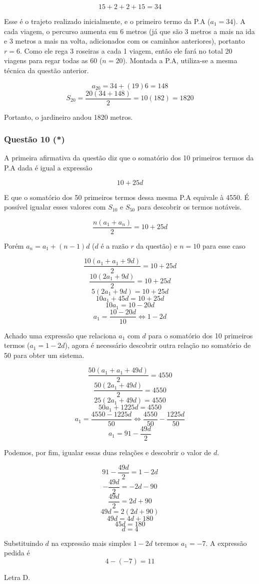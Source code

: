 \documentclass[11pt]{article}
\begin{document}
\[15 + 2 + 2 + 15 = 34\]

Esse é o trajeto realizado inicialmente, e o primeiro termo da P.A ($a_{1} = 34$). A cada viagem, o percurso aumenta em 6 metros (já que são 3 metros a mais na ida e 3 metros a mais na volta, adicionados com os caminhos anteriores), portanto $r = 6$. Como ele rega 3 roseiras a cada 1 viagem, então ele fará no total 20 viagens para regar todas as 60 ($n = 20$). Montada a P.A, utiliza-se a mesma técnica da questão anterior.

\[a_{20} = 34 + (19)6 = 148\]
\[S_{20} = \frac{20(34 + 148)}{2} = 10(182) = 1820\]

Portanto, o jardineiro andou 1820 metros.

\subsubsection{Questão 10 (*)}

A primeira afirmativa da questão diz que o somatório dos 10 primeiros termos da P.A dada é igual a expressão

\[10 + 25d\]

E que o somatório dos 50 primeiros termos dessa mesma P.A equivale à 4550. É possível igualar esses valores com $S_{10}$ e $S_{50}$ para descobrir os termos notáveis.

\[\frac{n(a_{1} + a_{n})}{2} = 10 + 25d\]

Porém $a_{n} = a_{1} + (n - 1)d$ ($d$ é a razão $r$ da questão) e $n = 10$ para esse caso

\[\frac{10(a_{1} + a_{1} + 9d)}{2} = 10 + 25d\]
\[\frac{10(2a_{1} + 9d)}{2} = 10 + 25d\]
\[5(2a_{1} + 9d) = 10 + 25d\]
\[10a_{1} + 45d = 10 + 25d\]
\[10a_{1} = 10 - 20d\]
\[a_{1} = \frac{10 - 20d}{10} \Leftrightarrow 1 - 2d\]

Achado uma expressão que relaciona $a_{1}$ com $d$ para o somatório dos 10 primeiros termos ($a_{1} = 1 - 2d$), agora é necessário descobrir outra relação no somatório de 50 para obter um sistema.

\[\frac{50(a_{1} + a_1 + 49d)}{2} = 4550\]
\[\frac{50(2a_{1} + 49d)}{2} = 4550\]
\[25(2a_{1} + 49d) = 4550\]
\[50a_{1} + 1225d = 4550\]
\[a_{1} = \frac{4550 - 1225d}{50} \Leftrightarrow \frac{4550}{50} - \frac{1225d}{50}\]
\[a_{1} = 91 - \frac{49d}{2}\]

Podemos, por fim, igualar essas duas relações e descobrir o valor de $d$.

\[91 - \frac{49d}{2} = 1 - 2d\]
\[-\frac{49d}{2} = -2d - 90\]
\[\frac{49d}{2} = 2d + 90\]
\[49d = 2(2d + 90)\]
\[49d = 4d + 180\]
\[45d = 180\]
\[d = 4\]

Substituindo $d$ na expressão mais simples $1 - 2d$ teremos $a_{1} = -7$. A expressão pedida é
\[4 - (-7) = 11\]

Letra D.
\end{document}
